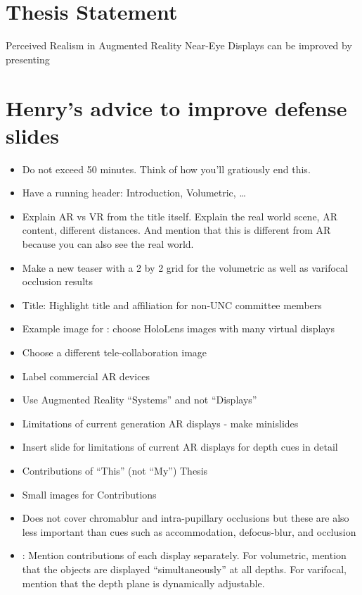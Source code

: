 \section{Thesis Statement}

Perceived Realism in Augmented Reality Near-Eye Displays can be improved by presenting 

\section{Henry's advice to improve defense slides}
\begin{itemize}
\item Do not exceed 50 minutes. Think of how you'll gratiously end this.
\item Have a running header: Introduction, Volumetric, \dots
\item Explain AR vs VR from the title itself. Explain the real world scene, AR content, different distances. And mention that this is different from AR because you can also see the real world. 
\item Make a new teaser with a 2 by 2 grid for the volumetric as well as varifocal occlusion results
\item Title: Highlight title and affiliation for non-UNC committee members
\item Example image for : choose HoloLens images with many virtual displays
\item Choose a different tele-collaboration image
\item Label commercial AR devices
\item Use Augmented Reality ``Systems'' and not ``Displays''
\item Limitations of current generation AR displays - make minislides
\item Insert slide for limitations of current AR displays for depth cues in detail
\item Contributions of ``This'' (not ``My'') Thesis
\item Small images for Contributions
\item Does not cover chromablur and intra-pupillary occlusions but these are also less important than cues such as accommodation, defocus-blur, and occlusion
\item {}: Mention contributions of each display separately. For volumetric, mention that the objects are displayed ``simultaneously'' at all depths. For varifocal, mention that the depth plane is dynamically adjustable.

\end{itemize}
